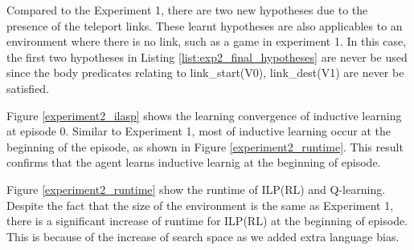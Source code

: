 
Compared to the Experiment 1, there are two new hypotheses due to the presence of the teleport links.
These learnt hypotheses are also applicables to an environment where there is no link, such as a game in experiment 1.
In this case, the first two hypotheses in Listing \ref{list:exp2_final_hypotheses} are never be used 
since the body predicates relating to link\_start(V0), link\_dest(V1) are never be satisfied.

Figure \ref{experiment2_ilasp} shows the learning convergence of inductive learning at episode 0.
Similar to Experiment 1, most of inductive learning occur at the beginning of the episode, as shown in Figure \ref{experiment2_runtime}. 
This result confirms that the agent learns inductive learnig at the beginning of episode.

Figure \ref{experiment2_runtime} show the runtime of ILP(RL) and Q-learning. 
Despite the fact that the size of the environment is the same as Experiment 1, 
there is a significant increase of runtime for ILP(RL) at the beginning of episode. 
This is because of the increase of search space as we added extra language bias.

